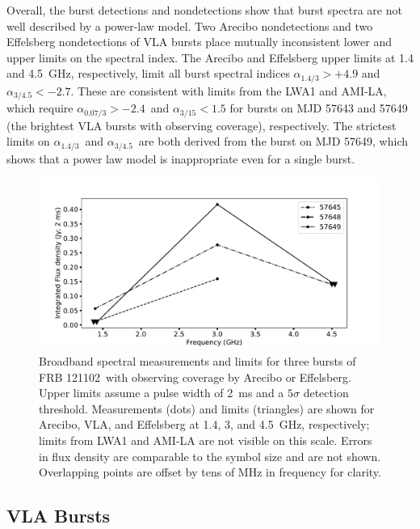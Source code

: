 \documentclass[twocolumn]{aastex61}
\newcommand{\frb}{FRB 121102}
\begin{document}
Overall, the burst detections and nondetections show that burst spectra are not well described by a power-law model. Two Arecibo nondetections and two Effelsberg nondetections of VLA bursts place mutually inconsistent lower and upper limits on the spectral index. The Arecibo and Effelsberg upper limits at 1.4 and 4.5~GHz, respectively, limit all burst spectral indices $\alpha_{1.4/3}>+4.9$ and $\alpha_{3/4.5}<-2.7$. These are consistent with limits from the LWA1 and AMI-LA, which require $\alpha_{0.07/3}>-2.4$\ and $\alpha_{3/15}<1.5$ for bursts on MJD 57643 and 57649 (the brightest VLA bursts with observing coverage), respectively. The strictest limits on $\alpha_{1.4/3}$\ and $\alpha_{3/4.5}$\ are both derived from the burst on MJD 57649, which shows that a power law model is inappropriate even for a single burst.

\begin{figure}[htb]
\begin{center}
 \includegraphics[width=2\columnwidth]{multispec.pdf}
 \caption{Broadband spectral measurements and limits for three bursts of \frb\ with observing coverage by Arecibo or Effelsberg. Upper limits assume a pulse width of 2~ms and a $5\sigma$ detection threshold. Measurements (dots) and limits (triangles) are shown for Arecibo, VLA, and Effelsberg at 1.4, 3, and 4.5~GHz, respectively; limits from LWA1 and AMI-LA are not visible on this scale. Errors in flux density are comparable to the symbol size and are not shown. Overlapping points are offset by tens of MHz in frequency for clarity.
 \label{fig:multi}}
\end{center}
\end{figure}

\subsection{VLA Bursts}
\end{document}
